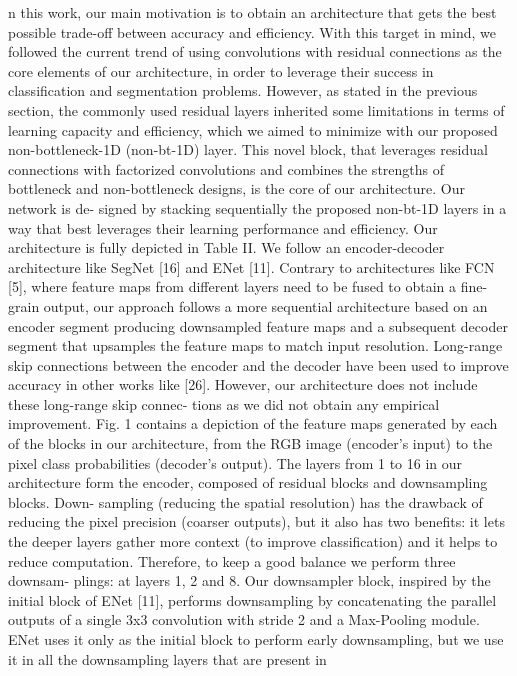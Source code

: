 n this work, our main motivation is to obtain an architecture
that gets the best possible trade-off between accuracy and
efficiency. With this target in mind, we followed the current
trend of using convolutions with residual connections as the
core elements of our architecture, in order to leverage their
success in classification and segmentation problems. However,
as stated in the previous section, the commonly used residual
layers inherited some limitations in terms of learning capacity
and efficiency, which we aimed to minimize with our proposed
non-bottleneck-1D (non-bt-1D) layer. This novel block, that
leverages residual connections with factorized convolutions
and combines the strengths of bottleneck and non-bottleneck
designs, is the core of our architecture. Our network is de-
signed by stacking sequentially the proposed non-bt-1D layers
in a way that best leverages their learning performance and
efficiency.
Our architecture is fully depicted in Table II. We follow an
encoder-decoder architecture like SegNet [16] and ENet [11].
Contrary to architectures like FCN [5], where feature maps
from different layers need to be fused to obtain a fine-grain
output, our approach follows a more sequential architecture
based on an encoder segment producing downsampled feature
maps and a subsequent decoder segment that upsamples the
feature maps to match input resolution. Long-range skip
connections between the encoder and the decoder have been
used to improve accuracy in other works like [26]. However,
our architecture does not include these long-range skip connec-
tions as we did not obtain any empirical improvement. Fig. 1
contains a depiction of the feature maps generated by each of
the blocks in our architecture, from the RGB image (encoder’s
input) to the pixel class probabilities (decoder’s output).
The layers from 1 to 16 in our architecture form the encoder,
composed of residual blocks and downsampling blocks. Down-
sampling (reducing the spatial resolution) has the drawback
of reducing the pixel precision (coarser outputs), but it also
has two benefits: it lets the deeper layers gather more context
(to improve classification) and it helps to reduce computation.
Therefore, to keep a good balance we perform three downsam-
plings: at layers 1, 2 and 8. Our downsampler block, inspired
by the initial block of ENet [11], performs downsampling by
concatenating the parallel outputs of a single 3x3 convolution with stride 2 and a Max-Pooling module. ENet uses it only
as the initial block to perform early downsampling, but we
use it in all the downsampling layers that are present in
